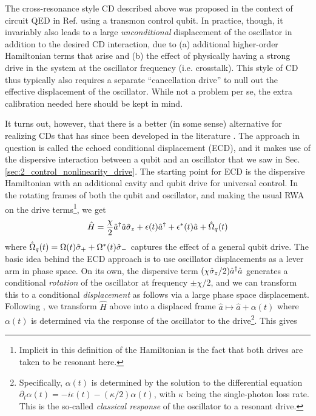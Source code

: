 The cross-resonance style CD described above was proposed in the context of circuit QED in Ref. \cite{touzard2019gated} using a transmon control qubit. In practice, though, it invariably also leads to a large \textit{unconditional} displacement of the oscillator in addition to the desired CD interaction, due to (a) additional higher-order Hamiltonian terms that arise and (b) the effect of physically having a strong drive in the system at the oscillator frequency (i.e. crosstalk). This style of CD thus typically also requires a separate ``cancellation drive'' to null out the effective displacement of the oscillator. While not a problem per se, the extra calibration needed here should be kept in mind. 

It turns out, however, that there is a better (in some sense) alternative for realizing CDs that has since been developed in the literature \cite{campagne2020gkp-expt, eickbusch2022fast}. The approach in question is called the echoed conditional displacement (ECD), and it makes use of the dispersive interaction between a qubit and an oscillator that we saw in Sec. \ref{sec:2_control_nonlinearity_drive}. The starting point for ECD is the dispersive Hamiltonian with an additional cavity and qubit drive for universal control. In the rotating frames of both the qubit and oscillator, and making the usual RWA on the drive terms\footnote{Implicit in this definition of the Hamiltonian is the fact that both drives are taken to be resonant here.}, we get 
\begin{equation}
    \hat{H} = \frac{\chi}{2}\hat{a}^\dagger\hat{a}\hat{\sigma}_z + \epsilon(t)\hat{a}^\dagger + \epsilon^\ast(t)\hat{a} + \hat{\Omega}_q(t)
\end{equation}
where $\hat{\Omega}_q(t) = \Omega(t)\hat{\sigma}_+ + \Omega^\ast(t)\hat{\sigma}_-$ captures the effect of a general qubit drive. The basic idea behind the ECD approach is to use oscillator displacements as a lever arm in phase space. On its own, the dispersive term $(\chi\hat{\sigma}_z/2)\hat{a}^\dagger\hat{a}$ generates a conditional \textit{rotation} of the oscillator at frequency $\pm \chi/2$, and we can transform this to a conditional \textit{displacement} as follows via a large phase space displacement. Following \cite{eickbusch2022fast}, we transform $\hat{H}$ above into a displaced frame $\hat{a} \mapsto \hat{a} + \alpha(t)$ where $\alpha(t)$ is determined via the response of the oscillator to the drive\footnote{Specifically, $\alpha(t)$ is determined by the solution to the differential equation $\partial_t\alpha(t) = -i\epsilon(t) - (\kappa/2)\alpha(t)$, with $\kappa$ being the single-photon loss rate. This is the so-called \textit{classical response} of the oscillator to a resonant drive.}. This gives
